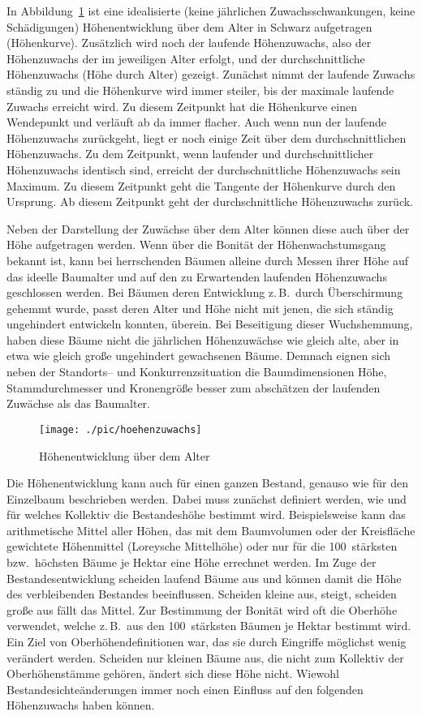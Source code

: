 \documentclass[twocolumn]{scrartcl}
\begin{document}
In Abbildung~\ref{fig:hoeheAlter} ist eine idealisierte (keine jährlichen
Zuwachsschwankungen, keine Schädigungen) Höhenentwicklung über dem Alter in
Schwarz aufgetragen (Höhenkurve). Zusätzlich wird noch der laufende
Höhenzuwachs, also der Höhenzuwachs der im jeweiligen Alter erfolgt, und der
durchschnittliche Höhenzuwachs (Höhe durch Alter) gezeigt. Zunächst nimmt der
laufende Zuwachs ständig zu und die Höhenkurve wird immer steiler, bis der
maximale laufende Zuwachs erreicht wird. Zu diesem Zeitpunkt hat die Höhenkurve
einen Wendepunkt und verläuft ab da immer flacher. Auch wenn nun der laufende
Höhenzuwachs zurückgeht, liegt er noch einige Zeit über dem durchschnittlichen
Höhenzuwachs. Zu dem Zeitpunkt, wenn laufender und durchschnittlicher
Höhenzuwachs identisch sind, erreicht der durchschnittliche Höhenzuwachs sein
Maximum. Zu diesem Zeitpunkt geht die Tangente der Höhenkurve durch den
Ursprung. Ab diesem Zeitpunkt geht der durchschnittliche Höhenzuwachs zurück.

Neben der Darstellung der Zuwächse über dem Alter können diese auch über der
Höhe aufgetragen werden. Wenn über die Bonität der Höhenwachstumsgang bekannt
ist, kann bei herrschenden Bäumen alleine durch Messen ihrer Höhe auf das
ideelle Baumalter und auf den zu Erwartenden laufenden Höhenzuwachs geschlossen
werden. Bei Bäumen deren Entwicklung z.\,B.\ durch Überschirmung gehemmt wurde,
passt deren Alter und Höhe nicht mit jenen, die sich ständig ungehindert
entwickeln konnten, überein. Bei Beseitigung dieser Wuchshemmung, haben diese
Bäume nicht die jährlichen Höhenzuwächse wie gleich alte, aber in etwa wie
gleich große ungehindert gewachsenen Bäume. Demnach eignen sich neben der
Standorts-- und Konkurrenzsituation die Baumdimensionen Höhe, Stammdurchmesser
und Kronengröße besser zum abschätzen der laufenden Zuwächse als das Baumalter.

\begin{figure}[htbp]
  \centering
  \texttt{[image: ./pic/hoehenzuwachs]}
  \caption{Höhenentwicklung über dem Alter}
  \label{fig:hoeheAlter}
\end{figure}

Die Höhenentwicklung kann auch für einen ganzen Bestand, genauso wie für den
Einzelbaum beschrieben werden. Dabei muss zunächst definiert werden, wie und für
welches Kollektiv die Bestandeshöhe bestimmt wird. Beispielsweise kann das
arithmetische Mittel aller Höhen, das mit dem Baumvolumen oder der Kreisfläche
gewichtete Höhenmittel (Loreysche Mittelhöhe) oder nur für die 100~stärksten
bzw.\ höchsten Bäume je Hektar eine Höhe errechnet werden. Im Zuge der
Bestandesentwicklung scheiden laufend Bäume aus und können damit die Höhe des
verbleibenden Bestandes beeinflussen. Scheiden kleine aus, steigt, scheiden
große aus fällt das Mittel. Zur Bestimmung der Bonität wird oft die Oberhöhe
verwendet, welche z.\,B.\ aus den 100~stärksten Bäumen je Hektar bestimmt wird.
Ein Ziel von Oberhöhendefinitionen war, das sie durch Eingriffe möglichst wenig
verändert werden. Scheiden nur kleinen Bäume aus, die nicht zum Kollektiv der
Oberhöhenstämme gehören, ändert sich diese Höhe nicht. Wiewohl
Bestandesichteänderungen immer noch einen Einfluss auf den folgenden
Höhenzuwachs haben können.
\end{document}
